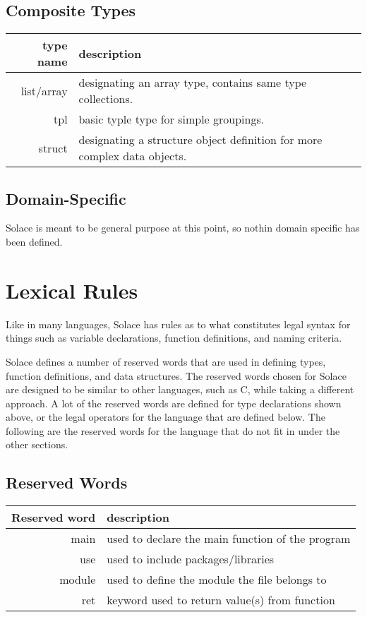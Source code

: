 \documentclass{article}
\begin{document}
\subsection{Composite Types}
\begin{center}
\begin{tabular}{|r|l|}
	\hline
	type name & description \\
	\hline
	\hline
	list/array & designating an array type, contains same type collections. \\
	tpl & basic typle type for simple groupings. \\
	struct & designating a structure object definition for more complex data objects. \\
	\hline
\end{tabular}
\end{center}

\subsection{Domain-Specific}
Solace is meant to be general purpose at this point, so nothin domain specific has been defined.


\section{Lexical Rules}
Like in many languages, Solace has rules as to what constitutes legal syntax for things such as
variable declarations, function definitions, and naming criteria.

Solace defines a number of reserved words that are used in defining types, function definitions,
and data structures. The reserved words chosen for Solace are designed to be similar to
other languages, such as C, while taking a different approach. A lot of the
reserved words are defined for type declarations shown above, or the legal operators for the 
language that are defined below. The following are the reserved words for the language
that do not fit in under the other sections.

\subsection{Reserved Words}

\begin{center}
\begin{tabular}{|r|l|}
\hline
Reserved word & description \\
\hline
\hline
main & used to declare the main function of the program \\
use & used to include packages/libraries \\
module & used to define the module the file belongs to \\
ret & keyword used to return value(s) from function \\
\hline
\end{tabular}
\end{center}
\end{document}
